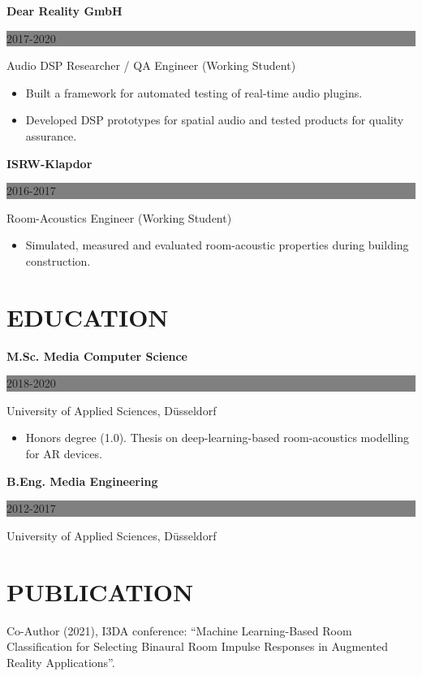 \documentclass[paper=a4,fontsize=9pt]{scrartcl}
\newcommand{\sepspace}{\vspace*{1em}}
\newcommand{\NewPart}[1]{\section*{\uppercase{#1}}}
\newcommand{\ExperienceEntry}[4]{
	\noindent \textbf{#1} \hfill
	\colorbox{Grey}{
		\parbox{6em}{
		\hfill\color{White}#2}} \par
	\noindent #3 \par
    \noindent \small #4
	\normalsize \par
}
\begin{document}
\sepspace
\ExperienceEntry{Dear Reality GmbH}{2017-2020}{Audio DSP Researcher / QA Engineer (Working Student)}{
    \begin{itemize}[itemsep=0pt, topsep=1pt, leftmargin=1.2em]
        \item Built a framework for automated testing of real-time audio plugins.
        \item Developed DSP prototypes for spatial audio and tested products for quality assurance.
    \end{itemize}
}
\sepspace
\ExperienceEntry{ISRW-Klapdor}{2016-2017}{Room-Acoustics Engineer (Working Student)}{
    \begin{itemize}[itemsep=0pt, topsep=1pt, leftmargin=1.2em]
        \item Simulated, measured and evaluated room-acoustic properties during building construction.
    \end{itemize}
}

\NewPart{Education}{}
\ExperienceEntry{M.Sc. Media Computer Science}{2018-2020}{University of Applied Sciences, Düsseldorf}{
    \begin{itemize}[leftmargin=1.2em, label={}]
        \item Honors degree (1.0). Thesis on deep-learning-based room-acoustics modelling for AR devices.
    \end{itemize}
}
\sepspace
\ExperienceEntry{B.Eng. Media Engineering}{2012-2017}{University of Applied Sciences, Düsseldorf}{}

\NewPart{Publication}{}
\noindent Co-Author (2021), I3DA conference: ``Machine Learning-Based Room Classification for Selecting Binaural Room Impulse Responses in Augmented Reality Applications''.
\end{document}
